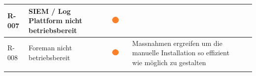 \begin{table}[H]
{\begin{tabular}{lllllll}
R-007                                                                       & SIEM / Log Plattform nicht betriebsbereit                                                          & {\includegraphics[width=0.05\linewidth]{source/status_report/main/risk_warning}}                     &                         &                                                                                                                                                              &                                                                                                                                                              &                                                                                                                               \\ \hline
R-008                                                                       & Foreman nicht betriebsbereit                                                                       & {\includegraphics[width=0.05\linewidth]{source/status_report/main/risk_warning}}                     &                         & Massnahmen ergreifen um die manuelle Installation so effizient wie möglich zu gestalten                                                                      &                                                                                                                                                              &                                                                                                                               \\ \hline
                                                                            &                                                                                                    &                                                                                                      &                         &                                                                                                                                                              &                                                                                                                                                              &                                                                                                                               \\

\end{tabular}}
\end{table}
